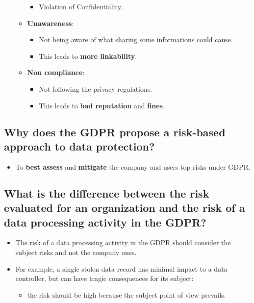 \documentclass[9pt, letterpaper]{article}
\begin{document}
\begin{itemize}
\begin{itemize}
\begin{itemize}
			            \item Violation of Confidentiality.
		            \end{itemize}
		      \item \textbf{Unawareness}:
		            \begin{itemize}
			            \item Not being aware of what sharing some informations could cause.
			            \item This leads to \textbf{more linkability}.
		            \end{itemize}
		      \item \textbf{Non compliance}:
		            \begin{itemize}
			            \item Not following the privacy regulations.
			            \item This leads to \textbf{bad reputation} and \textbf{fines}.
		            \end{itemize}
	      \end{itemize}
\end{itemize}

\subsection{Why does the GDPR propose a risk-based approach to data protection?}
\begin{itemize}
	\item To \textbf{best assess} and \textbf{mitigate} the company and users top risks under GDPR.
\end{itemize}

\subsection{What is the difference between the risk evaluated for an organization and the risk of a data processing activity in the GDPR?}
\begin{itemize}
	\item The risk of a data processing activity in the GDPR should consider the subject risks and not the company ones.
	\item For example, a single stolen data record has minimal impact to a data controller, but can have tragic consequences for its subject:
	      \begin{itemize}
		      \item the risk should be high because the subject point of view prevails.
	      \end{itemize}
\end{itemize}
\end{document}
